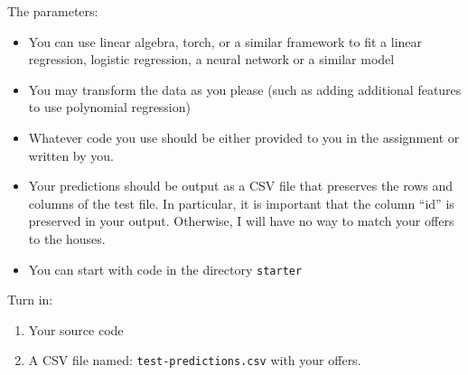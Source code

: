\documentclass[letterpaper]{article}
\begin{document}
The parameters:
\begin{itemize}
\item You can use linear algebra, torch, or a similar framework to fit a linear regression, logistic regression, a neural network or a similar model
\item You may transform the data as you please (such as adding additional features to use polynomial regression)
\item Whatever code you use should be either provided to you in the assignment or written by you. 
\item Your predictions should be output as a CSV file that preserves the rows and columns of the test file. In particular, it is important that the column ``id'' is preserved in your output. Otherwise, I will have no way to match your offers to the houses. 
\item You can start with code in the directory \texttt{starter}
\end{itemize}

Turn in:
\begin{enumerate}
\item Your source code
\item A CSV file named: \texttt{test-predictions.csv} with your offers. 
\end{enumerate}
\end{document}
